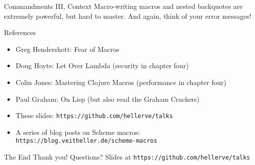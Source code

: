 \documentclass[aspectratio=169]{beamer}
\begin{document}
  \begin{frame}{Commandments III, Context}
    \Large Macro-writing macros and nested backquotes are extremely powerful, but
           hard to master. And again, think of your error messages!
  \end{frame}
  \begin{frame}{References}
    \begin{itemize}
      \item Greg Hendershott: Fear of Macros
      \item Doug Hoyte: Let Over Lambda (security in chapter four)
      \item Colin Jones: Mastering Clojure Macros (performance in chapter four)
      \item Paul Graham: On Lisp (but also read the Graham Crackers)
      \item These slides: \texttt{https://github.com/hellerve/talks}
      \item A series of blog posts on Scheme macros: \texttt{https://blog.veitheller.de/scheme-macros}
    \end{itemize}
  \end{frame}
  \begin{frame}{The End}
    \Huge Thank you!
    \linebreak
    \linebreak
    \linebreak
    \small Questions?
    \linebreak
    \linebreak
    \tiny Slides at \texttt{https://github.com/hellerve/talks}
  \end{frame}
\end{document}
